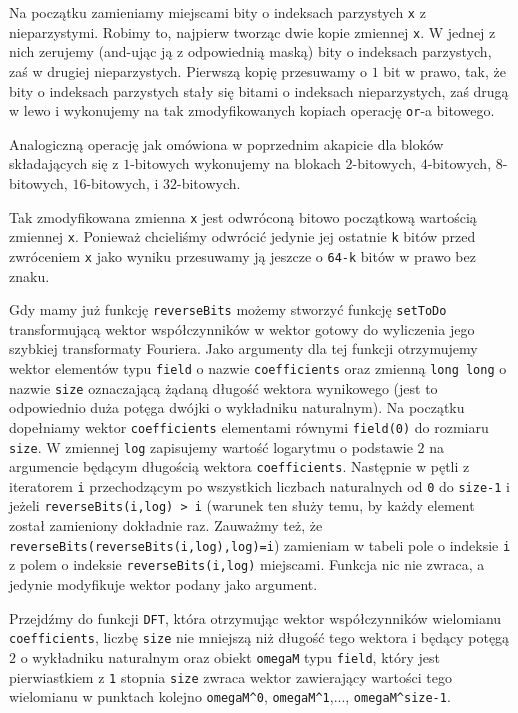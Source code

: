 \documentclass{article}
\begin{document}
Na początku zamieniamy miejscami bity o indeksach parzystych \texttt{x} z nieparzystymi.
Robimy to, najpierw tworząc dwie kopie zmiennej \texttt{x}. W jednej z nich zerujemy 
(and-ując ją z odpowiednią maską) bity o indeksach parzystych, zaś w drugiej nieparzystych.
Pierwszą kopię przesuwamy o $1$ bit w prawo, tak, że bity o indeksach parzystych stały się bitami
o indeksach nieparzystych, zaś drugą w lewo i wykonujemy na tak zmodyfikowanych kopiach operację
\texttt{or}-a bitowego. 

Analogiczną operację jak omówiona w poprzednim akapicie dla bloków składających się z $1$-bitowych 
wykonujemy na blokach $2$-bitowych, $4$-bitowych, $8$-bitowych, $16$-bitowych,
i $32$-bitowych. 

Tak zmodyfikowana zmienna \texttt{x} jest odwróconą bitowo początkową wartością zmiennej 
\texttt{x}. Ponieważ chcieliśmy odwrócić jedynie jej ostatnie \texttt{k} bitów przed 
zwróceniem \texttt{x} jako wyniku przesuwamy ją jeszcze o \texttt{64-k} bitów w prawo bez znaku.






Gdy mamy już funkcję \texttt{reverseBits} możemy stworzyć funkcję \texttt{setToDo} transformującą wektor współczynników w wektor gotowy
do wyliczenia jego szybkiej transformaty Fouriera. Jako argumenty dla tej funkcji otrzymujemy wektor elementów typu \texttt{field} o nazwie 
\texttt{coefficients} oraz 
zmienną \texttt{long long} o nazwie \texttt{size} oznaczającą żądaną długość wektora wynikowego (jest to odpowiednio duża potęga dwójki o wykładniku naturalnym). 
Na początku dopełniamy wektor 
\texttt{coefficients} elementami równymi \texttt{field(0)} do rozmiaru \texttt{size}. 
W zmiennej \texttt{log} zapisujemy wartość logarytmu o podstawie $2$ na argumencie będącym długością
wektora \texttt{coefficients}.
Następnie w pętli z iteratorem \texttt{i} przechodzącym po wszystkich liczbach naturalnych od \texttt{0} do 
\texttt{size-1} i jeżeli \texttt{reverseBits(i,log) > i} (warunek ten służy temu, by każdy element został zamieniony dokładnie raz. 
Zauważmy też, że \texttt{reverseBits(reverseBits(i,log),log)=i}) zamieniam w tabeli pole o indeksie \texttt{i} z polem o indeksie 
\texttt{reverseBits(i,log)} miejscami. Funkcja nic nie zwraca, a jedynie modyfikuje wektor podany jako argument.

Przejdźmy do funkcji \texttt{DFT}, która otrzymując wektor współczynników wielomianu \texttt{coefficients}, 
liczbę \texttt{size} nie mniejszą niż długość tego wektora i będący potęgą $2$ o wykładniku naturalnym oraz obiekt \texttt{omegaM} typu \texttt{field},
który jest pierwiastkiem z \texttt{1} stopnia \texttt{size} zwraca wektor zawierający wartości tego wielomianu w punktach kolejno 
\texttt{omegaM}\verb!^!\texttt{0}, \texttt{omegaM}\verb!^!\texttt{1},..., \texttt{omegaM}\verb!^!\texttt{size-1}. 
\end{document}
